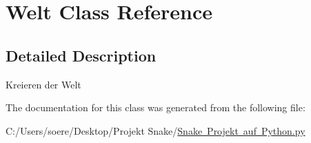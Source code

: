 \hypertarget{class_snake_01_projekt_01auf_01_python_1_1_welt}{}\section{Welt Class Reference}
\label{class_snake_01_projekt_01auf_01_python_1_1_welt}


\subsection{Detailed Description}
\begin{DoxyVerb}Kreieren der Welt\end{DoxyVerb}
 

The documentation for this class was generated from the following file\+:\begin{DoxyCompactItemize}
\item 
C\+:/\+Users/soere/\+Desktop/\+Projekt Snake/\mbox{\hyperlink{_snake_01_projekt_01auf_01_python_8py}{Snake Projekt auf Python.\+py}}\end{DoxyCompactItemize}
